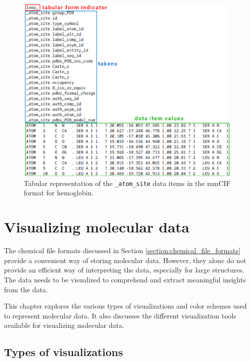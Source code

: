 \documentclass[
  digital,     %
  oneside,     %
  nosansbold,  %
  nocolorbold, %
  lof,         %
  lot,         %
]{fithesis4}
\begin{document}
\begin{figure}[htbp]
  \begin{center}
    \includegraphics[width=11cm]{figures/3bj1_mmcif.png}
  \end{center}
  \caption[Atom site mmCIF category.]{Tabular representation of the \texttt{\_atom\_site} data items in the mmCIF format for hemoglobin.}
  \label{fig:mmcif}
\end{figure}

\clearpage
\newpage

\chapter{Visualizing molecular data}
\label{chapter:visualizing_molecular_data}

The chemical file formats discussed in Section \ref{section:chemical_file_formats} provide a convenient way of storing molecular data. However, they alone do not provide an efficient way of interpreting the data, especially for large structures. The data needs to be visualized to comprehend and extract meaningful insights from the data. \cite{gu2009structural}

This chapter explores the various types of visualizations and color schemes used to represent molecular data. It also discusses the different visualization tools available for visualizing molecular data.

\section{Types of visualizations}
\label{section:types_of_visualizations}
\end{document}
